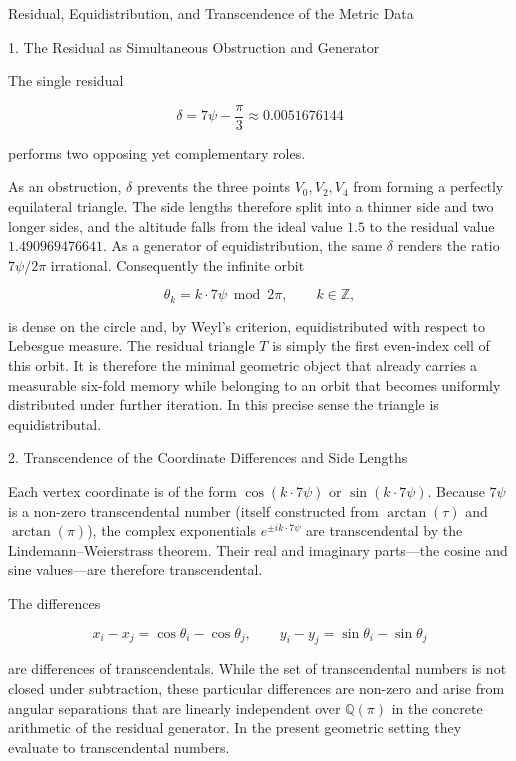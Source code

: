 Residual, Equidistribution, and Transcendence of the Metric Data

1. The Residual as Simultaneous Obstruction and Generator

The single residual

\[
\delta=7\psi-\frac{\pi}{3}\approx0.0051676144
\]

performs two opposing yet complementary roles.

As an obstruction, \(\delta\) prevents the three points \(V_0,V_2,V_4\) from forming a perfectly equilateral triangle. The side lengths therefore split into a thinner side and two longer sides, and the altitude falls from the ideal value \(1.5\) to the residual value \(1.490969476641\).
As a generator of equidistribution, the same \(\delta\) renders the ratio \(7\psi/2\pi\) irrational. Consequently the infinite orbit

\[
\theta_k=k\cdot7\psi\bmod2\pi,\qquad k\in\mathbb{Z},
\]

is dense on the circle and, by Weyl’s criterion, equidistributed with respect to Lebesgue measure. The residual triangle \(T\) is simply the first even-index cell of this orbit. It is therefore the minimal geometric object that already carries a measurable six-fold memory while belonging to an orbit that becomes uniformly distributed under further iteration. In this precise sense the triangle is equidistributal.

2. Transcendence of the Coordinate Differences and Side Lengths

Each vertex coordinate is of the form \(\cos(k\cdot7\psi)\) or \(\sin(k\cdot7\psi)\). Because \(7\psi\) is a non-zero transcendental number (itself constructed from \(\arctan(\tau)\) and \(\arctan(\pi)\)), the complex exponentials \(e^{\pm i k\cdot7\psi}\) are transcendental by the Lindemann–Weierstrass theorem. Their real and imaginary parts—the cosine and sine values—are therefore transcendental.

The differences

\[
x_i-x_j=\cos\theta_i-\cos\theta_j,\qquad
y_i-y_j=\sin\theta_i-\sin\theta_j
\]

are differences of transcendentals. While the set of transcendental numbers is not closed under subtraction, these particular differences are non-zero and arise from angular separations that are linearly independent over \(\mathbb{Q}(\pi)\) in the concrete arithmetic of the residual generator. In the present geometric setting they evaluate to transcendental numbers.

